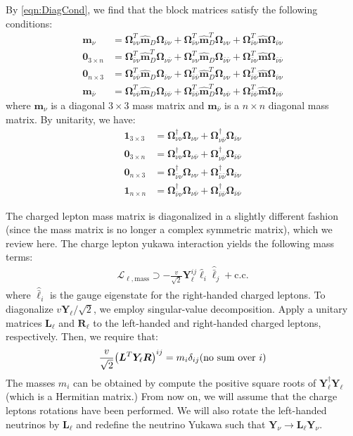 \documentclass[a4paper,11pt]{article} \pdfoutput=1
\newcommand{\rhn}{\bar{\nu}}
\newcommand{\cL}{\mathcal{L}}
\newcommand{\OmegaVVb}{\bm{\Omega}_{\nu\nu}}
\newcommand{\OmegaVNb}{\bm{\Omega}_{\nu\rhn}}
\newcommand{\OmegaNVb}{\bm{\Omega}_{\rhn\nu}}
\newcommand{\OmegaNNb}{\bm{\Omega}_{\rhn\rhn}}
\begin{document}
By \ref{eqn:DiagCond}, we find that the block matrices satisfy the following conditions:
\begin{align}
	\bm{m}_{\nu}       & =
	\OmegaVVb^{T}\hat{\bm{m}}_{D}\OmegaNVb+\OmegaNVb^{T}\hat{\bm{m}}^{T}_{D}\OmegaVVb+\OmegaNVb^{T}\hat{\bm{m}}\OmegaNVb \\
	\bm{0}_{3\times n} & =
	\OmegaNVb^{T}\hat{\bm{m}}^{T}_{D}\OmegaVNb+\OmegaVVb^{T}\hat{\bm{m}}_{D}\OmegaNNb+\OmegaNVb^{T}\hat{\bm{m}}\OmegaNNb \\
	\bm{0}_{n\times 3} & =
	\OmegaVNb^{T}\hat{\bm{m}}_{D}\OmegaNVb
	+\OmegaNNb^{T}\hat{\bm{m}}^{T}_{D}\OmegaVVb
	+\OmegaNNb^{T} \hat{\bm{m}}\OmegaNVb                                                                                 \\
	\bm{m}_{\rhn}      & =
	\OmegaVNb^{T}\hat{\bm{m}}_{D}\OmegaNNb
	+\OmegaNNb^{T}\hat{\bm{m}}^{T}_{D}\OmegaVNb
	+\OmegaNNb^{T} \hat{\bm{m}}\OmegaNNb
\end{align}
where \(\bm{m}_{\nu}\) is a diagonal \(3\times3\) mass matrix and \(\bm{m}_{\rhn}\) is a
\(n\times n\) diagonal mass matrix. By unitarity, we have:
\begin{align}
	\bm{1}_{3\times3}  & = \OmegaVVb^{\dagger}\OmegaVVb+\OmegaVNb^{\dagger}\OmegaNVb \\
	\bm{0}_{3\times n} & = \OmegaVVb^{\dagger}\OmegaVNb+\OmegaVNb^{\dagger}\OmegaNNb \\
	\bm{0}_{n\times3}  & = \OmegaNVb^{\dagger}\OmegaVVb+\OmegaNNb^{\dagger}\OmegaNVb \\
	\bm{1}_{n\times n} & = \OmegaNVb^{\dagger}\OmegaVNb+\OmegaNNb^{\dagger}\OmegaNNb
\end{align}

The charged lepton mass matrix is diagonalized in a slightly different fashion (since the mass matrix
is no longer a complex symmetric matrix), which we review here. The charge lepton
yukawa interaction yields the following mass terms:
\begin{align}
	\cL_{\ell,\mathrm{mass}}\supset -\frac{v}{\sqrt{2}}\bm{Y}_{\ell}^{ij}
	\hat{\ell}_{i}\hat{\bar{\ell}}_{j} + \mathrm{c.c.}
\end{align}
where \(\hat{\bar{\ell}}_{i}\) is the gauge eigenstate for the right-handed charged leptons.
To diagonalize \(v\bm{Y}_{\ell}/\sqrt{2}\), we employ singular-value decomposition. Apply
a unitary matrices \(\bm{L}_{\ell}\) and \(\bm{R}_{\ell}\) to the left-handed and right-handed
charged leptons, respectively. Then, we require that:
\begin{align}
	\frac{v}{\sqrt{2}}
	\qty(\bm{L}^T\bm{Y}_{\ell}\bm{R})^{ij}
	= m_{i}\delta_{ij}
	(\text{no sum over } i)
\end{align}
The masses \(m_{i}\) can be obtained by compute the positive square roots of
\(\bm{Y}_{\ell}^{\dagger}\bm{Y}_{\ell}\) (which is a Hermitian matrix.) From now on,
we will assume that the charge leptons rotations have been performed. We will also rotate
the left-handed neutrinos by \(\bm{L}_{\ell}\) and redefine the neutrino Yukawa such
that \(\bm{Y}_{\nu}\to \bm{L}_{\ell}\bm{Y}_{\nu}\).
\end{document}
